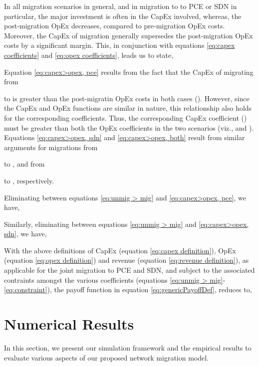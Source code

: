 \documentclass[smallextended]{svjour3}
\begin{document}
\par In all migration scenarios in general, and in migration to  to PCE or SDN
in particular, the major investment is often in the CapEx involved, whereas, the post-migration
OpEx decreases, compared to pre-migration OpEx costs. Moreover, the CapEx of
migration generally supersedes the post-migration OpEx costs by a significant margin.
This, in conjunction with equations \eqref{eq:capex coefficients} and
\eqref{eq:opex coefficients}, leads us to state,







Equation \eqref{eq:capex>opex, pce} results from the fact that the CapEx
of migrating from

to  is greater than the
post-migratin OpEx costs in both cases (). However, since the
CapEx and OpEx functions are similar in nature, this relationship also
holds for the corresponding coefficients. Thus, the corresponding CapEx
coefficient () must be greater than both the OpEx coefficients
in the two scenarios (viz.,
 and
). Equations
\eqref{eq:capex>opex, sdn} and \eqref{eq:capex>opex, both} result from similar
arguments for migrations from

to , and from

to , respectively.

\par Eliminating  between equations
\eqref{eq:unmig > mig} and \eqref{eq:capex>opex, pce}, we have,


Similarly, eliminating  between equations
\eqref{eq:unmig > mig} and \eqref{eq:capex>opex, sdn}, we have,


\par With the above definitions of CapEx (equation \eqref{eq:capex definition}),
OpEx (equation \eqref{eq:opex definition}) and revenue (equation
\eqref{eq:revenue definition}), as applicable for the joint migration to PCE and
SDN, and subject to the associated contraints amongst the various coefficients
(equations \eqref{eq:unmig > mig}-\eqref{eq:constraint}), the payoff function in equation
\eqref{eq:genericPayoffDef}, reduces to,



\section{Numerical Results} \label{sec:rd}
In this section, we present our simulation framework and the empirical
results to evaluate various aspects of our proposed network migration model.
\end{document}
